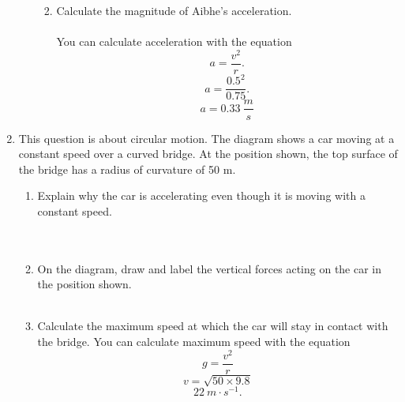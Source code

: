 \documentclass[a4paper]{report}
\begin{document}
\begin{enumerate}
\begin{enumerate}
\begin{enumerate}
\begin{equation}
                \end{equation}
                \item Calculate the magnitude of Aibhe's acceleration. \\ \\ 
                    You can calculate acceleration with the equation
                    \[
                    a = \frac{v^2}{r}
                    .\] 
                    \[
                    a = \frac{0.5^2}{0.75}
                    .\] 
                    \begin{equation}
                        \boxed{a = 0.33\ \frac{m}{s}}
                    \end{equation}
            \end{enumerate}
            \end{enumerate} 
            \item This question is about circular motion. The diagram shows a car moving at a constant speed over a curved bridge. At the position shown, the top surface of the bridge has a radius of curvature of 50 m. 
            \begin{enumerate}
                \item Explain why the car is accelerating even though it is moving with a constant speed. \\ \\ 
                     \\ 
                \item On the diagram, draw and label the vertical forces acting on the car in the position shown. \\ \\ 
                    \noindent{}
            \item Calculate the maximum speed at which the car will stay in contact with the bridge. 
                You can calculate maximum speed with the equation
                \begin{equation}
                    g = \frac{v^2}{r}
                \end{equation}
                \begin{equation}
                    v = \sqrt{50 \times 9.8}
                \end{equation}
                \begin{equation}
                    \boxed{22\ m \cdot s^{-1}.}
                \end{equation}
            \end{enumerate}
    \end{enumerate}
\end{document}
